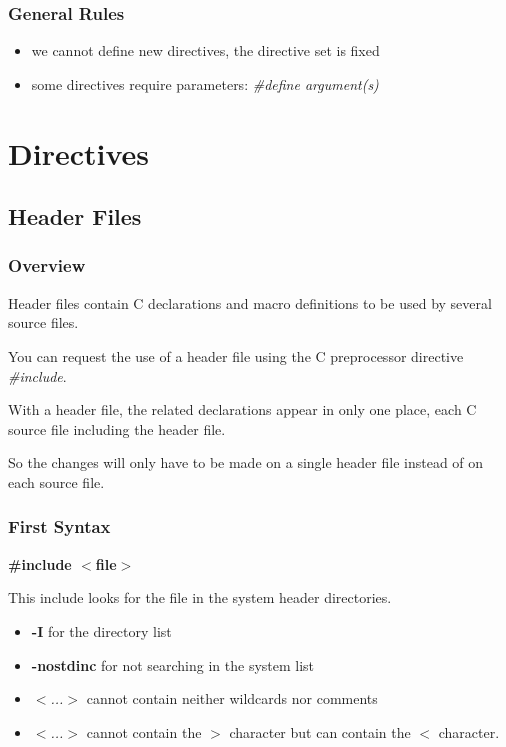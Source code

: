 
\begin{frame}
  \frametitle{General Rules}

  \begin{itemize}[<+->]
    \item
      we \alert{cannot} define new directives, the directive set is fixed
    \item
      some directives require parameters: \textit{\#define argument(s)}
  \end{itemize}
\end{frame}

%
%

\section{Directives}

%
%

\subsection{Header Files}


\begin{frame}
  \frametitle{Overview}

  Header files contain C declarations and macro definitions to be used
  by several source files.

  \nl

  You can request the use of a header file using the C preprocessor
  directive \textit{\#include}.

  \nl

  With a header file, the related declarations appear in only one place,
  each C source file including the header file.

  \nl

  So the changes will only have to be made on a single header file
  instead of on each source file.
\end{frame}


\begin{frame}[containsverbatim]
  \frametitle{First Syntax}

  \textbf{\#include $<$file$>$}

  \nl

  This include looks for the file in the system header directories.

  \begin{itemize}
  \item
    \textbf{-I} for the directory list
  \item
    \textbf{-nostdinc} for not searching in the system list
  \item
    \textit{$<$...$>$} cannot contain neither wildcards nor comments
  \item
    \textit{$<$...$>$} cannot contain the \textbf{$>$} character but
    can contain the \textbf{$<$} character.
  \end{itemize}
\end{frame}


